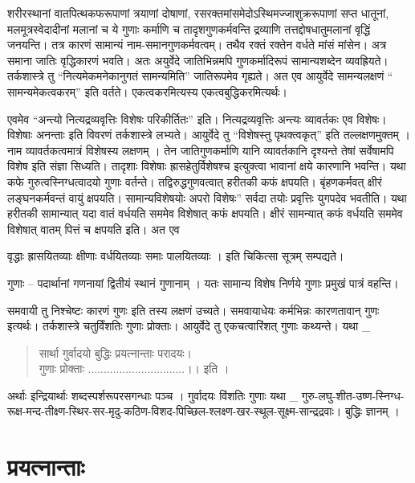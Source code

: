 \begin{vere}
शरीरस्थानां वातपित्थकफरूपाणां त्रयाणां दोषाणां, रसरक्तमांसमेदोऽस्थिमज्जाशुक्ररूपाणां सप्त धातूनां, मलमूत्रस्वेदादीनां मलानां च ये गुणाः कर्माणि च तादृशगुणकर्मवन्ति द्रव्याणि तत्तद्दोषधातुमलानां वृद्धिं जनयन्ति। तत्र कारणं सामान्यं नाम-समानगुणकर्मवत्वम्। तथैव रक्तं रक्तेन वर्धते मांसं मांसेन। अत्र समाना जातिः वृद्धिकारणं भवति। अतः अयुर्वेदे जातिभिन्नमपि गुणकर्मादिरूपं सामान्यशब्देन व्यवह्रियते। तर्कशास्त्रे तु “नित्यमेकमनेकानुगतं सामन्यमिति” जातिरूपमेव गृह्यते। अत एव आयुर्वेदे सामन्यलक्षणं “ सामन्यमेकत्वकरम्” इति वर्तते। एकत्वकरमित्यस्य एकत्वबुद्धिकरमित्यर्थः।

एवमेव “अन्त्यो नित्यद्रव्यवृत्तिः विशेषः परिकीर्तितः” इति। नित्यद्रव्यवृत्तिः अन्त्यः व्यावर्तकः एव विशेषः। विशेषाः अनन्ताः इति विवरणं तर्कशास्त्रे लभ्यते। आयुर्वेदे तु “विशेषस्तु पृथक्त्वकृत्” इति तल्लक्षणमुक्तम् । नाम व्यावर्तकत्वमात्रं विशेषस्य लक्षणम् । तेन जातिगुणकर्माणि यानि व्यावर्तकानि दृश्यन्ते तेषां सर्वेषामपि विशेष इति संज्ञा सिध्यति। तादृशाः विशेषाः ह्रासहेतुर्विशेषश्च इत्युक्त्वा भावानां क्षये कारणानि भवन्ति। यथा कफे गुरुत्वस्निग्धत्वादयो गुणाः वर्तन्ते। तद्विरुद्धगुणवत्वात् हरीतकी कफं क्षपयति। बृंहणकर्मवत् क्षीरं लङ्घनकर्मवन्तं वायुं क्षपयति। सामान्यविशेषयोः अपरो विशेषः” सर्वदा तयोः प्रवृत्तिः युगपदेव भवतीति। यथा हरीतकी सामान्यात् यदा वातं वर्धयति सममेव विशेषात् कफं क्षपयति। क्षीरं सामन्यात् कफं वर्धयति सममेव विशेषात् वातम् पित्तं च क्षपयति इति। अत एव

वृद्धाः ह्रासयितव्याः क्षीणाः वर्धयितव्याः समाः पालयितव्याः । इति चिकित्सा सूत्रम् सम्पद्यते।

गुणाः – पदार्थानां गणनायां द्वितीयं स्थानं गुणानाम् । यतः सामान्य विशेष निर्णये गुणाः प्रमुखं पात्रं वहन्ति।

समवायी तु निश्चेष्टः कारणं गुणः इति तस्य लक्षणं उच्यते। समवायाधेयः कर्मभिन्नः कारणतावान् गुणः इत्यर्थः। तर्कशास्त्रे चतुर्विंशतिः गुणाः प्रोक्ताः। आयुर्वेदे तु एकचत्वारिंशत् गुणाः कथ्यन्ते। यथा _
\begin{verse}
सार्था गुर्वादयो बुद्धिः प्रयत्नान्ताः परादयः।\\
गुणाः प्रोक्ताः ...............................।। इति ।
\end{verse}
अर्थाः इन्द्रियार्थाः शब्दस्पर्शरूपरसगन्धाः पञ्च । गुर्वादयः विंशतिः गुणाः यथा \_ गुरु-लघु-शीत-उष्ण-स्निग्ध- रूक्ष-मन्द-तीक्ष्ण-स्थिर-सर-मृदु-कठिण-विशद-पिच्छिल-श्लक्ष्ण-खर-स्थूल-सूक्ष्म-सान्द्रद्रवाः। बुद्धिः ज्ञानम् ।

\section*{प्रयत्नान्ताः}


\end{vere}
